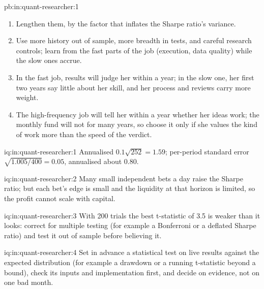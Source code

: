 \begin{solution}{pb:in:quant-researcher:1}
\begin{enumerate}
\item Lengthen them, by the factor that inflates the Sharpe ratio's variance.
\item Use more history out of sample, more breadth in tests, and careful research controls; learn from the fast parts of the
job (execution, data quality) while the slow ones accrue.
\item In the fast job, results will judge her within a year; in the slow one, her first two years say little about her
skill, and her process and reviews carry more weight.
\item The high-frequency job will tell her within a year whether her ideas work; the monthly fund will not for many years,
so choose it only if she values the kind of work more than the speed of the verdict.
\end{enumerate}
\end{solution}

\begin{solution}{iq:in:quant-researcher:1}
Annualised $0.1\sqrt{252}=1.59$; per-period standard error $\sqrt{1.005/400}=0.05$, annualised about 0.80.
\end{solution}

\begin{solution}{iq:in:quant-researcher:2}
Many small independent bets a day raise the Sharpe ratio; but each bet's edge is small and the liquidity at that horizon is
limited, so the profit cannot scale with capital.
\end{solution}

\begin{solution}{iq:in:quant-researcher:3}
With 200 trials the best t-statistic of 3.5 is weaker than it looks: correct for multiple testing (for example a Bonferroni
or a deflated Sharpe ratio) and test it out of sample before believing it.
\end{solution}

\begin{solution}{iq:in:quant-researcher:4}
Set in advance a statistical test on live results against the expected distribution (for example a drawdown or a running
t-statistic beyond a bound), check its inputs and implementation first, and decide on evidence, not on one bad month.
\end{solution}

